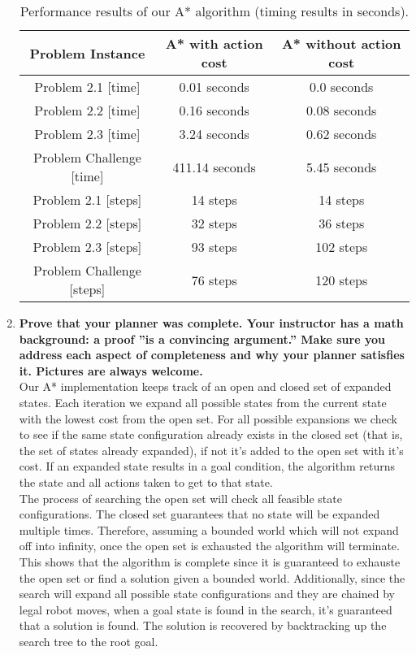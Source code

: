 \documentclass[12pt]{article}
\begin{document}
\begin{enumerate}
    \begin{table}%
    \label{table:results2}
    \caption{Performance results of our A* algorithm (timing results in seconds).}
    \begin{tabular*}{1.0\textwidth}{c|c|c}
    \hline
    \bfseries Problem Instance & \bfseries A* with action cost  & \bfseries A* without action cost \\
    \hline\hline
    Problem 2.1 [time] 		&  0.01 seconds &  0.0 seconds 	\\ \hline    
    Problem 2.2 [time] 		&  0.16 seconds &  0.08 seconds 	\\ \hline
    Problem 2.3 [time] 		&  3.24 seconds &  0.62 seconds 	\\ \hline
    Problem Challenge [time] 	&  411.14 seconds &  5.45 seconds 	\\ \hline\hline
    Problem 2.1 [steps]		&  14 steps &  14 steps 	\\ \hline
    Problem 2.2 [steps]		&  32 steps &  36 steps 	\\ \hline
    Problem 2.3 [steps]		&  93 steps &  102 steps 	\\ \hline
    Problem Challenge [steps]	&  76 steps &  120 steps 	\\ \hline
    \hline
    \end{tabular*}
    \end{table}
  \item \textbf{Prove that your planner was complete. Your instructor has a math background: a proof ”is
a convincing argument.” Make sure you address each aspect of completeness and why your
planner satisfies it. Pictures are always welcome.}\\
Our A* implementation keeps track of an open and closed set of expanded states. Each iteration we expand all possible states from the current state with the lowest cost from the open set. For all possible expansions we check to see if the same state configuration already exists in the closed set (that is, the set of states already expanded), if not it's added to the open set with it's cost. If an expanded state results in a goal condition, the algorithm returns the state and all actions taken to get to that state.\\
The process of searching the open set will check all feasible state configurations. The closed set guarantees that no state will be expanded multiple times. Therefore, assuming a bounded world which will not expand off into infinity, once the open set is exhausted the algorithm will terminate. This shows that the algorithm is complete since it is guaranteed to exhauste the open set or find a solution given a bounded world. Additionally, since the search will expand all possible state configurations and they are chained by legal robot moves, when a goal state is found in the search, it's guaranteed that a solution is found. The solution is recovered by backtracking up the search tree to the root goal.



\end{enumerate}
\end{document}
